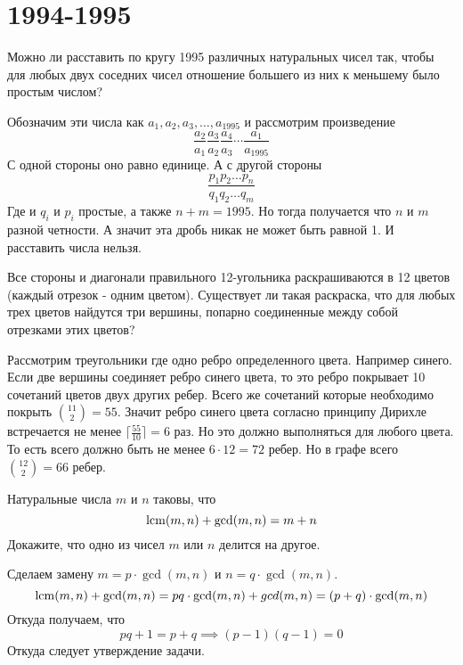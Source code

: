 \documentclass[11pt, a4paper]{template}
\begin{document}
\chapter{1994-1995}

\begin{exercise}
Можно ли расставить по кругу 1995 различных натуральных чисел так, чтобы для любых двух соседних чисел отношение большего из них к меньшему было простым числом?
\end{exercise}

\begin{solution}
Обозначим эти числа как $a_{1}, a_{2}, a_{3}, \dots, a_{1995}$ и рассмотрим произведение
$$
\frac{a_{2}}{a_{1}} \frac{a_{3}}{a_{2}}\frac{a_{4}}{a_{3}}\cdots \frac{a_{1}}{a_{1995}}
$$
С одной стороны оно равно единице. А с другой стороны
$$
\frac{p_{1} p_{2} \dots p_{n}}{q_{1}q_{2}\dots q_{m}}
$$
Где и $q_{i}$ и $p_{i}$ простые, а также $n + m = 1995$. Но тогда получается что $n$ и $m$ разной четности. А значит эта дробь никак не может быть равной 1. И расставить числа нельзя.
\end{solution}

\begin{exercise}
Все стороны и диагонали правильного 12-угольника раскрашиваются в 12 цветов (каждый отрезок - одним цветом). Существует ли такая раскраска, что для любых трех цветов найдутся три вершины, попарно соединенные между собой отрезками этих цветов?
\end{exercise}

\begin{solution}
Рассмотрим треугольники где одно ребро определенного цвета. Например синего. Если две вершины соединяет ребро синего цвета, то это ребро покрывает 10 сочетаний цветов двух других ребер. Всего же сочетаний которые необходимо покрыть $\binom{11}{2} = 55$. Значит ребро синего цвета согласно принципу Дирихле встречается не менее $\lceil \frac{55}{10} \rceil = 6$ раз. Но это должно выполняться для любого цвета. То есть всего должно быть не менее $6 \cdot 12 = 72$ ребер. Но в графе всего $\binom{12}{2} = 66$ ребер. 
\end{solution}

\begin{exercise}
Натуральные числа $m$ и $n$ таковы, что
$$
\operatorname{lcm}(m, n) + \gcd(m, n) = m + n 
$$
Докажите, что одно из чисел $m$ или $n$ делится на другое.
\end{exercise}

\begin{solution}
Сделаем замену $m = p \cdot \gcd(m, n)$ и $n = q \cdot \gcd(m, n)$. 
$$
\operatorname{lcm}(m, n) + \gcd(m, n) = pq \cdot \gcd(m, n) + gcd(m, n) = (p + q) \cdot \gcd(m, n)
$$
Откуда получаем, что
$$
pq + 1 = p + q \implies (p - 1)(q - 1) = 0
$$
Откуда следует утверждение задачи.
\end{solution}
\end{document}
